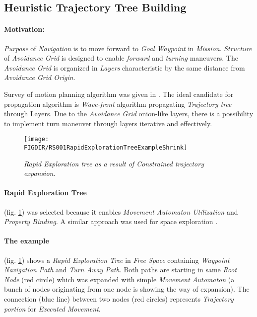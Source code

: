\subsection{Heuristic Trajectory Tree Building}\label{s:constrainedTrajectoryExpansion}

\paragraph{Motivation:} \emph{Purpose} of \emph{Navigation} is to move forward to \emph{Goal Waypoint} in \emph{Mission}. \emph{Structure} of \emph{Avoidance Grid} is designed to enable \emph{forward} and \emph{turning} maneuvers. The \emph{Avoidance Grid} is organized in \emph{Layers} characteristic by the same distance from \emph{Avoidance Grid Origin}. 

Survey of motion planning algorithm was given in \cite{goerzen2009survey}. The ideal candidate for propagation algorithm is \emph{Wave-front} algorithm propagating \emph{Trajectory tree} through Layers. Due to the \emph{Avoidance Grid} onion-like layers, there is a possibility to implement turn maneuver through layers iterative and effectively.

\begin{figure}[H]
    \centering
    \texttt{[image: \\FIGDIR/RS001RapidExplorationTreeExampleShrink]} 
    \caption{\emph{Rapid Exploration tree as a result of \emph{Constrained trajectory expansion}}.}
    \label{fig:rapidExplorationTrajectoryTree}
\end{figure}

\paragraph{Rapid Exploration Tree} (fig. \ref{fig:rapidExplorationTrajectoryTree}) was selected because it enables \emph{Movement Automaton Utilization} and \emph{Property Binding}. A similar approach was used for space exploration \cite{plaisant2002spacetree}. 

\paragraph{The example} (fig. \ref{fig:rapidExplorationTrajectoryTree}) shows a \emph{Rapid Exploration Tree} in \emph{Free Space} containing \emph{Waypoint Navigation Path} and \emph{Turn Away Path}. Both paths are starting in same \emph{Root Node} (red circle) which was expanded with simple \emph{Movement Automaton} (a bunch of nodes originating from one node is showing the way of expansion). The connection (blue line) between two nodes (red circles) represents \emph{Trajectory portion} for \emph{Executed Movement}.

